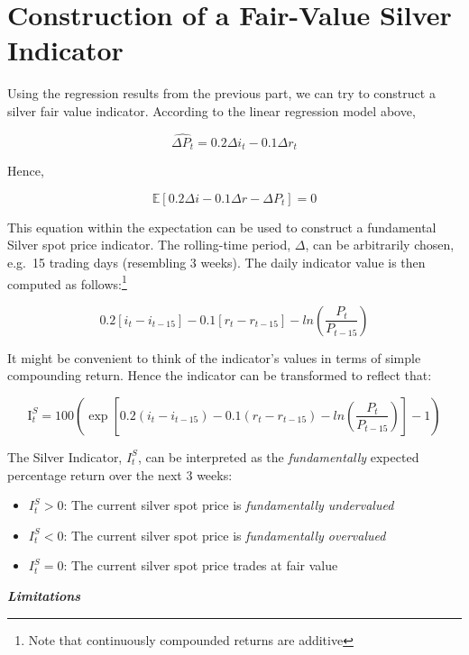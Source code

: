 \documentclass[
  12pt,
]{article}
\providecommand{\tightlist}{%
  \setlength{\itemsep}{0pt}\setlength{\parskip}{0pt}}
\begin{document}
\newpage

\hypertarget{construction-of-a-fair-value-silver-indicator}{%
\section{Construction of a Fair-Value Silver
Indicator}\label{construction-of-a-fair-value-silver-indicator}}

Using the regression results from the previous part, we can try to
construct a silver fair value indicator. According to the linear
regression model above,

\[\widehat{\Delta P_t} = 0.2 \Delta i_t -0.1 \Delta r_t\]

Hence,

\[\mathbb{E}[0.2 \Delta i - 0.1 \Delta r - \Delta P_t] = 0\]

This equation within the expectation can be used to construct a
fundamental Silver spot price indicator. The rolling-time period,
\(\Delta\), can be arbitrarily chosen, e.g.~15 trading days (resembling
3 weeks). The daily indicator value is then computed as
follows:\footnote{Note that continuously compounded returns are additive}

\[0.2 [i_t-i_{t-15}] - 0.1[r_t - r_{t-15}] - ln \left( \frac{P_t}{P_{t-15}} \right)\]

It might be convenient to think of the indicator's values in terms of
simple compounding return. Hence the indicator can be transformed to
reflect that:

\[\text{I}^S_t=100\left( \exp \left[ 0.2 (i_t-i_{t-15}) - 0.1(r_t - r_{t-15}) - ln \left( \frac{P_t}{P_{t-15}} \right) \right] -1 \right)\]

The Silver Indicator, \(I^S_t\), can be interpreted as the
\emph{fundamentally} expected percentage return over the next 3 weeks:

\begin{itemize}
\tightlist
\item
  \(I^S_t > 0\): The current silver spot price is \emph{fundamentally
  undervalued}
\item
  \(I^S_t < 0\): The current silver spot price is \emph{fundamentally
  overvalued}
\item
  \(I^S_t = 0\): The current silver spot price trades at fair value
\end{itemize}

\vspace{5 mm}

\textbf{\emph{Limitations}}
\end{document}
